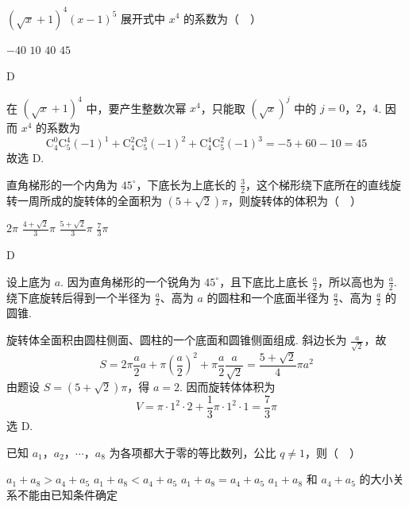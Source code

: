 \begin{problem}
\(\left(\sqrt{x}+1\right)^4\left(x-1\right)^5\) 展开式中 \(x^4\) 的系数为（\(\quad\)）

\choices
    {\(-40\)}
    {\(10\)}
    {\(40\)}
    {\(45\)}
\end{problem}

\begin{answer}
D
\end{answer}

\begin{solution}
在 \((\sqrt{x}+1)^4\) 中，要产生整数次幂 \(x^4\)，只能取 \((\sqrt{x})^j\) 中的 \(j=0\)，\(2\)，\(4\). 因而 \(x^4\) 的系数为
\[
\mathrm C_4^0\mathrm C_5^4(-1)^1
 +\mathrm C_4^2\mathrm C_5^3(-1)^2
 +\mathrm C_4^4\mathrm C_5^2(-1)^3
=-5+60-10=45
\]
故选 D.
\end{solution}

\begin{problem}
直角梯形的一个内角为 \(45^{\circ}\)，下底长为上底长的 \(\frac{3}{2}\)，这个梯形绕下底所在的直线旋转一周所成的旋转体的全面积为 \(\left(5+\sqrt{2}\right)\pi\)，则旋转体的体积为（\(\quad\)）

\choices
    {\(2\pi\)}
    {\(\frac{4+\sqrt{2}}{3}\pi\)}
    {\(\frac{5+\sqrt{2}}{3}\pi\)}
    {\(\frac{7}{3}\pi\)}
\end{problem}

\begin{answer}
D
\end{answer}

\begin{solution}
设上底为 \(a\). 因为直角梯形的一个锐角为 \(45^\circ\)，且下底比上底长 \(\frac{a}{2}\)，所以高也为 \(\frac{a}{2}\). 绕下底旋转后得到一个半径为 \(\frac{a}{2}\)、高为 \(a\) 的圆柱和一个底面半径为 \(\frac{a}{2}\)、高为 \(\frac{a}{2}\) 的圆锥.

旋转体全面积由圆柱侧面、圆柱的一个底面和圆锥侧面组成. 斜边长为 \(\frac{a}{\sqrt{2}}\)，故
\[
S=2\pi\frac a2 a+\pi\left(\frac a2\right)^2+\pi\frac a2\frac a{\sqrt2}
=\frac{5+\sqrt2}{4}\pi a^2
\]
由题设 \(S=(5+\sqrt2)\pi\)，得 \(a=2\). 因而旋转体体积为
\[
V=\pi\cdot1^2\cdot2+\frac13\pi\cdot1^2\cdot1=\frac73\pi
\]
选 D.
\end{solution}

\begin{problem}
已知 \(a_1\)，\(a_2\)，\(\cdots\)，\(a_8\) 为各项都大于零的等比数列，公比 \(q\neq 1\)，则（\(\quad\)）

\choices
    {\(a_1+a_8>a_4+a_5\)}
    {\(a_1+a_8<a_4+a_5\)}
    {\(a_1+a_8=a_4+a_5\)}
    {\(a_1+a_8\) 和 \(a_4+a_5\) 的大小关系不能由已知条件确定}
\end{problem}

